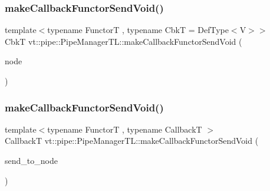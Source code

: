 \subsubsection{\texorpdfstring{make\+Callback\+Functor\+Send\+Void()}{makeCallbackFunctorSendVoid()}\hspace{0.1cm}{\footnotesize\ttfamily [1/2]}}
{\footnotesize\ttfamily template$<$typename FunctorT , typename CbkT  = Def\+Type$<$\+V$>$$>$ \\
CbkT vt\+::pipe\+::\+Pipe\+Manager\+T\+L\+::make\+Callback\+Functor\+Send\+Void (\begin{DoxyParamCaption}\item[{\hyperlink{namespacevt_a866da9d0efc19c0a1ce79e9e492f47e2}{Node\+Type} const \&}]{node }\end{DoxyParamCaption})}

\mbox{\label{structvt_1_1pipe_1_1_pipe_manager_t_l_a71bfb005f664ca5f0f6935afbcdb17de}} 
\subsubsection{\texorpdfstring{make\+Callback\+Functor\+Send\+Void()}{makeCallbackFunctorSendVoid()}\hspace{0.1cm}{\footnotesize\ttfamily [2/2]}}
{\footnotesize\ttfamily template$<$typename FunctorT , typename CallbackT $>$ \\
CallbackT vt\+::pipe\+::\+Pipe\+Manager\+T\+L\+::make\+Callback\+Functor\+Send\+Void (\begin{DoxyParamCaption}\item[{\hyperlink{namespacevt_a866da9d0efc19c0a1ce79e9e492f47e2}{Node\+Type} const \&}]{send\+\_\+to\+\_\+node }\end{DoxyParamCaption})}

\mbox{\label{structvt_1_1pipe_1_1_pipe_manager_t_l_a8a4da1e38acd018f847aa9fddae44956}} 
